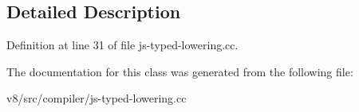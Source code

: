 \subsection{Detailed Description}


Definition at line 31 of file js-\/typed-\/lowering.\+cc.



The documentation for this class was generated from the following file\+:\begin{DoxyCompactItemize}
\item 
v8/src/compiler/js-\/typed-\/lowering.\+cc\end{DoxyCompactItemize}
